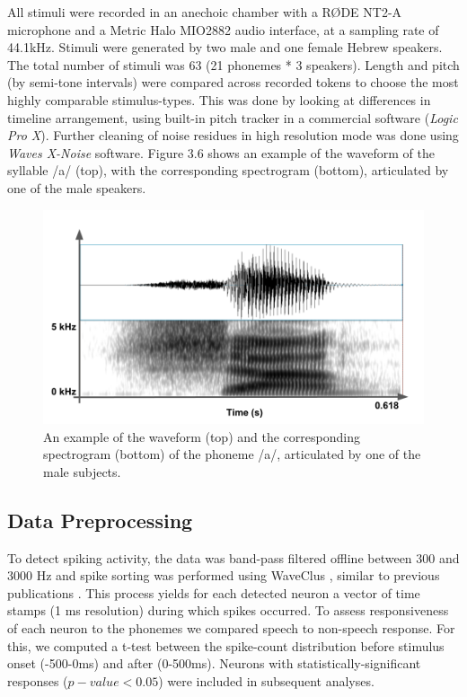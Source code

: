 All stimuli were recorded in an anechoic chamber with a RØDE NT2-A microphone and a Metric Halo MIO2882 audio interface, at a sampling rate of 44.1kHz. Stimuli were generated by two male and one female Hebrew speakers. The total number of stimuli was 63 (21 phonemes * 3 speakers). Length and pitch (by semi-tone intervals) were compared across recorded tokens to choose the most highly comparable stimulus-types. This was done by looking at differences in timeline arrangement, using built-in pitch tracker in a commercial software (\textit{Logic Pro X}). Further cleaning of noise residues in high resolution mode was done using \textit{Waves X-Noise} software. Figure 3.6 shows an example of the waveform of the syllable /a/ (top), with the corresponding spectrogram (bottom), articulated by one of the male speakers. 

\begin{figure}[H]
\vspace{.3in}
\includegraphics[width=\linewidth]{Figures/Ch3/spectrogram_sha.png}
\caption{An example of the waveform (top) and the corresponding spectrogram (bottom) of the phoneme /a/, articulated by one of the male subjects.}
\end{figure}

\subsection{Data Preprocessing}
To detect spiking activity, the data was band-pass filtered offline between 300 and 3000 Hz and spike sorting was performed using WaveClus \citep{quiroga2004unsupervised}, similar to previous publications \citep{quiroga2005invariant}. This process yields for each detected neuron a vector of time stamps (1 ms resolution) during which spikes occurred. To assess responsiveness of each neuron to the phonemes we compared speech to non-speech response. For this, we computed a t-test between the spike-count distribution before stimulus onset (-500-0ms) and after (0-500ms). Neurons with statistically-significant responses ($p-value<0.05$) were included in subsequent analyses. 

